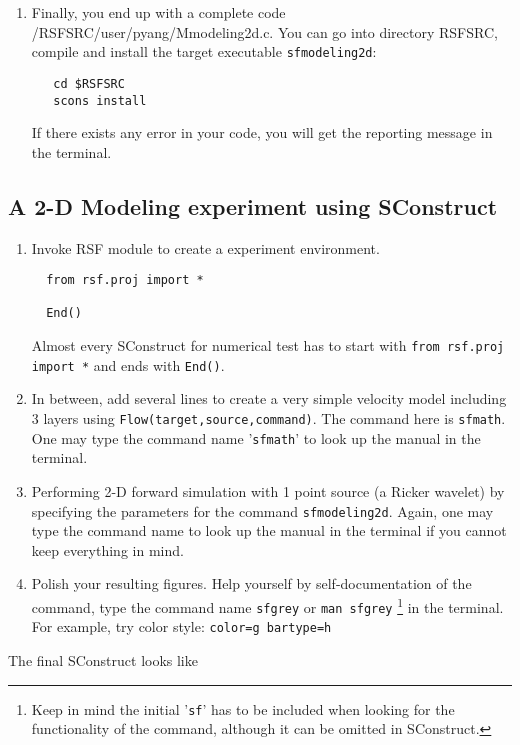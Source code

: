 \begin{enumerate}
\begin{lstlisting}
 \end{lstlisting}
  
  \item Finally, you end up with a complete code /RSFSRC/user/pyang/Mmodeling2d.c. You can go into directory RSFSRC, compile and install the target executable \texttt{sfmodeling2d}:
\begin{verbatim}
   cd $RSFSRC
   scons install
\end{verbatim}
If there exists any error in your code, you will get the reporting message in the terminal.   
\end{enumerate}


\subsection{A 2-D Modeling experiment using SConstruct}

\begin{enumerate}
 \item Invoke RSF module to create a experiment environment. 
\lstset{language=python,numbers=left,numberstyle=\tiny,showstringspaces=false,frame=single}
 \begin{lstlisting}
  from rsf.proj import *

  End()
 \end{lstlisting}
 Almost every SConstruct for numerical test has to start with \texttt{from rsf.proj import *} and ends with \texttt{End()}.

 \item In between, add several lines to create a very simple velocity model including 3 layers using \texttt{Flow(target,source,command)}. The command here is \texttt{sfmath}. One may type the command name '\texttt{sfmath}' to look up the manual in the terminal.
 \item Performing 2-D forward simulation with 1 point source (a Ricker wavelet) by specifying the parameters for the command \texttt{sfmodeling2d}. Again, one may type the command name to look up the manual in the terminal if you cannot keep everything in mind.

 \item Polish your resulting figures. Help yourself by self-documentation of the command, type the command name \texttt{sfgrey}  or \texttt{man sfgrey} \footnote{Keep in mind the initial '\texttt{sf}' has to be included when looking for the functionality of the command, although it can be omitted in SConstruct.} in the terminal. For example, try color style: \texttt{color=g bartype=h}
\end{enumerate}
The final SConstruct looks like



